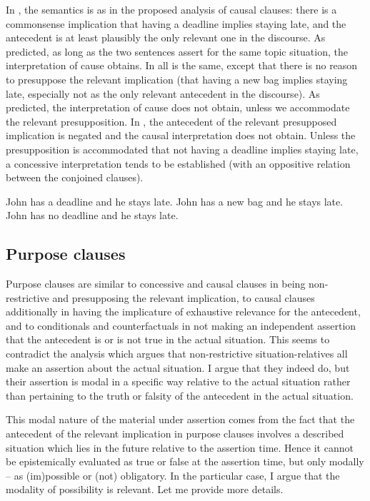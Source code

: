\documentclass[output=paper,
colorlinks,
citecolor=brown,
newtxmath
]{langscibook}
\begin{document}
In , the semantics is as in the proposed analysis of causal clauses: there is a commonsense implication that having a deadline implies staying late, and the antecedent is at least plausibly the only relevant one in the discourse. As predicted, as long as the two sentences assert for the same topic situation, the interpretation of cause obtains. In  all is the same, except that there is no reason to presuppose the relevant implication (that having a new bag implies staying late, especially not as the only relevant antecedent in the discourse). As predicted, the interpretation of cause does not obtain, unless we accommodate the relevant presupposition. In , the antecedent of the relevant presupposed implication is negated and the causal interpretation does not obtain. Unless the presupposition is accommodated that not having a deadline implies staying late, a concessive interpretation tends to be established (with an oppositive relation between the conjoined clauses).

\ea\label{ex:CausTest}
\ea John has a deadline and he stays late.\label{ex:CausTest-a}
\ex John has a new bag and he stays late.\label{ex:CausTest-b}
\ex John has no deadline and he stays late.\label{ex:CausTest-c}
\z\z

\subsection{Purpose clauses}

Purpose clauses are similar to concessive and causal clauses in being non-restric\-tive and presupposing the relevant implication, to causal clauses additionally in having the implicature of exhaustive relevance for the antecedent, and to conditionals and counterfactuals in not making an independent assertion that the antecedent is or is not true in the actual situation. This seems to contradict the analysis which argues that non-restrictive situation-relatives all make an assertion about the actual situation. I argue that they indeed do, but their assertion is modal in a specific way relative to the actual situation rather than pertaining to the truth or falsity of the antecedent in the actual situation.

This modal nature of the material under assertion comes from the fact that the antecedent of the relevant implication in purpose clauses involves a described situation which lies in the future relative to the assertion time. Hence it cannot be epistemically evaluated as true or false at the assertion time, but only modally -- as (im)possible or (not) obligatory. In the particular case, I argue that the modality of possibility is relevant. Let me provide more details.
\end{document}
